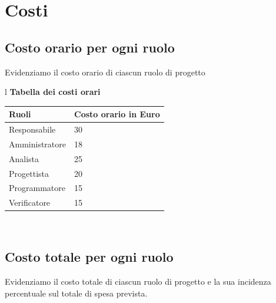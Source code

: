 \documentclass[11pt,titlepage,a4paper]{report}
\begin{document}
\chapter{Costi}
\section{Costo orario per ogni ruolo}
Evidenziamo il costo orario di ciascun ruolo di progetto
\begin{table}[hbtp]
\large{
\begin{tabular}{l}
\Large{\textbf{\textsf{Tabella dei costi orari}}} \\
\begin{tabular}{||p{6cm}||p{5cm}||}\hline
\textbf{Ruoli} & \textbf{Costo orario in Euro}\\ \hline
{Responsabile}&30\\ \hline 
{Amministratore} &18\\ \hline
{Analista} &25 \\ \hline
{Progettista} &20 \\ \hline
{Programmatore} &15\\ \hline
{Verificatore} &15 \\ \hline
\end{tabular} \\
\end{tabular}
}
\end{table}

\section{Costo totale per ogni ruolo}
Evidenziamo il costo totale di ciascun ruolo di progetto e la sua incidenza
percentuale sul totale di spesa prevista.
\end{document}
